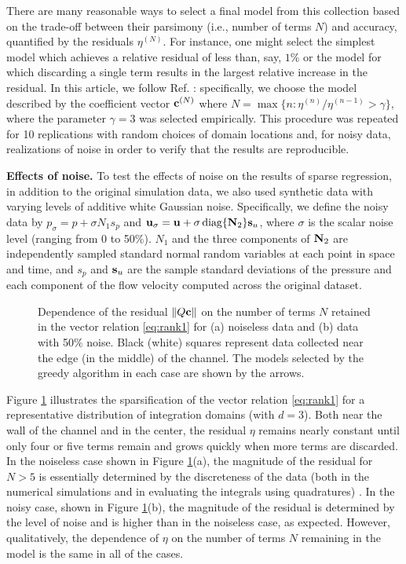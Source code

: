 \documentclass[9pt,twocolumn,twoside,lineno]{pnas-new}
\begin{document}
There are many reasonable ways to select a final model from this collection based on the trade-off between their parsimony (i.e., number of terms $N$) and accuracy, quantified by the residuals $\eta^{(N)}$. For instance, one might select the simplest model which achieves a relative residual of less than, say, $1\%$ or the model for which discarding a single term results in the largest relative increase in the residual. In this article, we follow Ref. \cite{gurevich2019}: specifically, we choose the model described by the coefficient vector ${\bf c}^{(N)}$ where $N = \max\{n : \eta^{(n)}/\eta^{(n-1)} > \gamma\}$, where the parameter $\gamma = 3$ was selected empirically. This procedure was repeated for 10 replications with random choices of domain locations and, for noisy data, realizations of noise in order to verify that the results are reproducible. 

{\bf Effects of noise.} To test the effects of noise on the results of sparse regression, in addition to the original simulation data, we also used synthetic data with varying levels of additive white Gaussian noise. Specifically, we define the noisy data by $p_{\sigma} = p + \sigma N_1 s_p$ and ${\bf u}_{\sigma} = {\bf u} + \sigma\,\text{diag}\{{\bf N}_2\}{\bf s}_u$, where $\sigma$ is the scalar noise level (ranging from 0 to 50\%). $N_1$ and the three components of ${\bf N}_2$ are independently sampled standard normal random variables at each point in space and time, and $s_p$ and ${\bf s}_u$ are the sample standard deviations of the pressure and each component of the flow velocity computed across the original dataset.

\begin{figure*}[t]
\centering
{}
\hfill
{}
\caption{Dependence of the residual $\|Q{\bf c}\|$ on the number of terms $N$ retained in the vector relation \eqref{eq:rank1} for (a) noiseless data and (b) data with 50\% noise. Black (white) squares represent data collected near the edge (in the middle) of the channel. The models selected by the greedy algorithm in each case are shown by the arrows.
}
\label{fig:pareto}
\end{figure*}

Figure \ref{fig:pareto} illustrates the sparsification of the vector relation \eqref{eq:rank1} for a representative distribution of integration domains (with $d=3$). Both near the wall of the channel and in the center, the residual $\eta$ remains nearly constant until only four or five terms remain and grows quickly when more terms are discarded. In the noiseless case shown in Figure \ref{fig:pareto}(a), the magnitude of the residual for $N>5$ is essentially determined by the discreteness of the data (both in the numerical simulations and in evaluating the integrals using quadratures) \cite{gurevich2019}. In the noisy case, shown in Figure \ref{fig:pareto}(b), the magnitude of the residual is determined by the level of  noise and is higher than in the noiseless case, as expected. However, qualitatively, the dependence of $\eta$ on the number of terms $N$ remaining in the model is the same in all of the cases.
\end{document}

